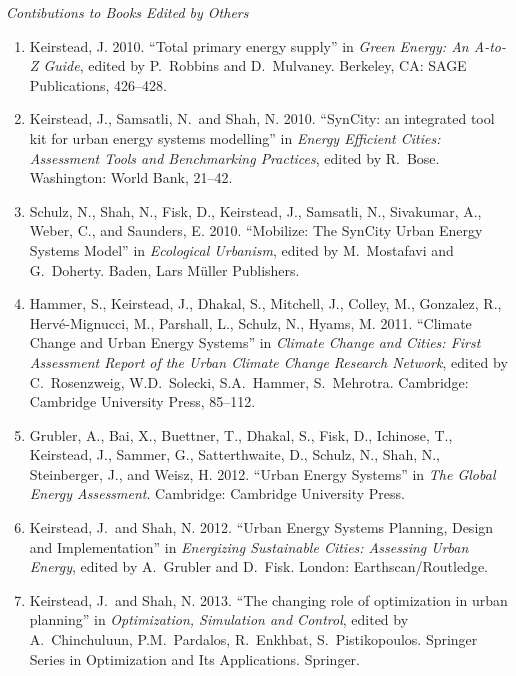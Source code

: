\documentclass[11pt,a4paper]{article}
\begin{document}
\noindent\emph{Contibutions to Books Edited by Others \vspace{0.01in}}
\begin{enumerate}
\item Keirstead, J. 2010. ``Total primary energy supply'' in \emph{Green Energy: An A-to-Z Guide}, edited by P.\ Robbins and D.\ Mulvaney.  Berkeley, CA: SAGE Publications, 426--428.

\item Keirstead, J., Samsatli, N.\  and Shah, N. 2010. ``SynCity: an integrated tool kit for urban energy systems modelling'' in \emph{Energy Efficient Cities: Assessment Tools and Benchmarking Practices}, edited by R.\ Bose.  Washington: World Bank, 21--42.

\item Schulz, N., Shah, N., Fisk, D., Keirstead, J., Samsatli, N., Sivakumar, A., Weber, C., and Saunders, E. 2010. ``Mobilize: The SynCity Urban Energy Systems Model'' in \emph{Ecological Urbanism}, edited by M.\ Mostafavi and G.\ Doherty.  Baden, Lars M\"{u}ller Publishers.

\item Hammer, S., Keirstead, J., Dhakal, S., Mitchell, J., Colley, M., Gonzalez, R., Herv\'{e}-Mignucci, M., Parshall, L., Schulz, N., Hyams, M. 2011. ``Climate Change and Urban Energy Systems'' in \emph{Climate Change and Cities: First Assessment Report of the Urban Climate Change Research Network}, edited by C.\ Rosenzweig, W.D.\ Solecki, S.A.\ Hammer, S.\ Mehrotra.  Cambridge: Cambridge University Press, 85--112.\label{book:uccrn}

\item Grubler, A., Bai, X., Buettner, T., Dhakal, S., Fisk, D., Ichinose, T., Keirstead, J., Sammer, G., Satterthwaite, D., Schulz, N., Shah, N., Steinberger, J., and Weisz, H. 2012. ``Urban Energy Systems'' in \emph{The Global Energy Assessment}. Cambridge: Cambridge University Press.

\item Keirstead, J.\  and Shah, N. 2012. ``Urban Energy Systems Planning, Design and Implementation'' in \emph{Energizing Sustainable Cities: Assessing Urban Energy}, edited by A.\ Grubler and D.\ Fisk. London: Earthscan/Routledge.

\item Keirstead, J.\  and Shah, N. 2013. ``The changing role of optimization in urban planning'' in \emph{Optimization, Simulation and Control}, edited by A.\ Chinchuluun, P.M.\ Pardalos, R.\ Enkhbat, S.\ Pistikopoulos.  Springer Series in Optimization and Its Applications.  Springer.\label{book:urban_opt}



\end{enumerate}
\end{document}
